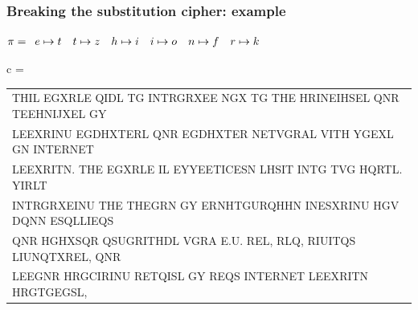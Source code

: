 \documentclass[aspectratio=169, lualatex, 10pt,dvipsnames,svgnames]{beamer} %
\def\enbleu#1{\textcolor{bleu}{#1}}
\def\enrouge#1{\textcolor{rouge}{#1}}
\begin{document}
\begin{frame}
  \frametitle{Breaking the substitution cipher: example}
  
    \enrouge{
    \tiny{$\pi=
      \begin{array}[t]{l}
       e\mapsto t\quad t\mapsto z \quad h\mapsto i\quad i\mapsto o\quad n\mapsto f\quad r\mapsto k
       \end{array}
      $}}
  \vspace{0.25cm}

  \color{vert}
  \tiny{c =
    \begin{tabular}[t]{l}
      \enbleu{T}\enbleu{H}\enbleu{I}L EGX\enbleu{R}L\enbleu{E} Q\enbleu{I}DL \enbleu{T}G \enbleu{I}\enbleu{N}\enbleu{T}\enbleu{R}GRXE\enbleu{E} NGX \enbleu{T}G \enbleu{T}\enbleu{H}\enbleu{E} H\enbleu{R}\enbleu{I}\enbleu{N}E\enbleu{I}HS\enbleu{E}L Q\enbleu{N}R \enbleu{T}\enbleu{E}E\enbleu{H}\enbleu{N}\enbleu{I}JX\enbleu{E}L GY \\
      L\enbleu{E}EX\enbleu{R}\enbleu{I}\enbleu{N}U EGDHX\enbleu{T}\enbleu{E}\enbleu{R}L Q\enbleu{N}R EGDHX\enbleu{T}\enbleu{E}\enbleu{R} \enbleu{N}\enbleu{E}\enbleu{T}VG\enbleu{R}AL V\enbleu{I}\enbleu{T}\enbleu{H} YGEXL G\enbleu{N} \enbleu{I}\enbleu{N}\enbleu{T}\enbleu{E}\enbleu{R}\enbleu{N}\enbleu{E}\enbleu{T} \\
      L\enbleu{E}EX\enbleu{R}\enbleu{I}\enbleu{T}N. \enbleu{T}\enbleu{H}\enbleu{E} EGX\enbleu{R}L\enbleu{E} \enbleu{I}L \enbleu{E}YY\enbleu{E}E\enbleu{T}\enbleu{I}C\enbleu{E}SN LHS\enbleu{I}\enbleu{T} \enbleu{I}\enbleu{N}\enbleu{T}G \enbleu{T}VG HQ\enbleu{R}\enbleu{T}L. Y\enbleu{I}\enbleu{R}L\enbleu{T} \\
      \enbleu{I}\enbleu{N}\enbleu{T}\enbleu{R}GRXE\enbleu{I}\enbleu{N}U \enbleu{T}\enbleu{H}\enbleu{E} \enbleu{T}\enbleu{H}\enbleu{E}G\enbleu{R}N GY E\enbleu{R}NH\enbleu{T}GU\enbleu{R}QH\enbleu{H}N \enbleu{I}\enbleu{N}ESXR\enbleu{I}\enbleu{N}U \enbleu{H}GV DQ\enbleu{N}N ESQLL\enbleu{I}EQS \\
      Q\enbleu{N}R HGHXSQ\enbleu{R} QSUG\enbleu{R}\enbleu{I}\enbleu{T}\enbleu{H}DL VG\enbleu{R}A \enbleu{E}.U. R\enbleu{E}L, \enbleu{R}LQ, R\enbleu{I}U\enbleu{I}\enbleu{T}QS L\enbleu{I}U\enbleu{N}Q\enbleu{T}X\enbleu{R}\enbleu{E}L, Q\enbleu{N}R \\
      L\enbleu{E}EG\enbleu{N}R H\enbleu{R}GC\enbleu{I}R\enbleu{I}\enbleu{N}U R\enbleu{E}\enbleu{T}Q\enbleu{I}SL GY \enbleu{R}\enbleu{E}QS \enbleu{I}\enbleu{N}\enbleu{T}\enbleu{E}\enbleu{R}\enbleu{N}\enbleu{E}\enbleu{T} L\enbleu{E}EX\enbleu{R}\enbleu{I}\enbleu{T}N H\enbleu{R}G\enbleu{T}GEGSL, \\

\end{tabular}}
\end{frame}
\end{document}
